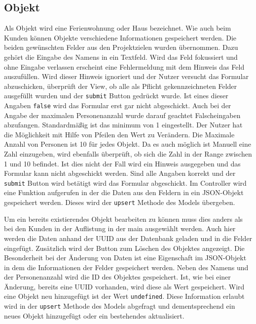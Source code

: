\subsection{Objekt}
Als Objekt wird eine Ferienwohnung oder Haus bezeichnet. Wie auch beim Kunden können Objekte verschiedene Informationen gespeichert werden. Die beiden gewünschten Felder aus den Projektzielen wurden übernommen. Dazu gehört die Eingabe des Namens in ein Textfeld. Wird das Feld fokussiert und ohne Eingabe verlassen erscheint eine Fehlermeldung mit dem Hinweis das Feld auszufüllen. Wird dieser Hinweis ignoriert und der Nutzer versucht das Formular abzuschicken, überprüft der View, ob alle als Pflicht gekennzeichneten Felder ausgefüllt wurden und der \texttt{submit} Button gedrückt wurde. Ist eines dieser Angaben \texttt{false} wird das Formular erst gar nicht abgeschickt. Auch bei der Angabe der maximalen Personenanzahl wurde darauf geachtet Falscheingaben abzufangen. Standardmäßig ist das minimum von 1 eingestellt. Der Nutzer hat die Möglichkeit mit Hilfe von Pfeilen den Wert zu Verändern. Die Maximale Anzahl von Personen ist 10 für jedes Objekt. Da es auch möglich ist Manuell eine Zahl einzugeben, wird ebenfalls überprüft, ob sich die Zahl in der Range zwischen 1 und 10 befindet. Ist dies nicht der Fall wird ein Hinweis ausgegeben und das Formular kann nicht abgeschickt werden. Sind alle Angaben korrekt und der \texttt{submit} Button wird betätigt wird das Formular abgeschickt. Im Controller wird eine Funktion aufgerufen in der die Daten aus den Feldern in ein JSON-Objekt gespeichert werden. Dieses wird der \texttt{upsert} Methode des Models übergeben.

Um ein bereits existierendes Objekt bearbeiten zu können muss dies anders als bei den Kunden in der Auflistung in der main ausgewählt werden. Auch hier werden die Daten anhand der UUID aus der Datenbank geladen und in die Felder eingefügt. Zusätzlich wird der Button zum Löschen des Objektes angezeigt. Die Besonderheit bei der Änderung von Daten ist eine Eigenschaft im JSON-Objekt in dem die Informationen der Felder gespeichert werden. Neben des Namens und der Personenanzahl wird die ID des Objektes gespeichert. Ist, wie bei einer Änderung, bereits eine UUID vorhanden, wird diese als Wert gespeichert. Wird eine Objekt neu hinzugefügt ist der Wert \texttt{undefined}. Diese Information erlaubt wird in der \texttt{upsert} Methode des Models abgefragt und dementsprechend ein neues Objekt hinzugefügt oder ein bestehendes aktualisiert.


